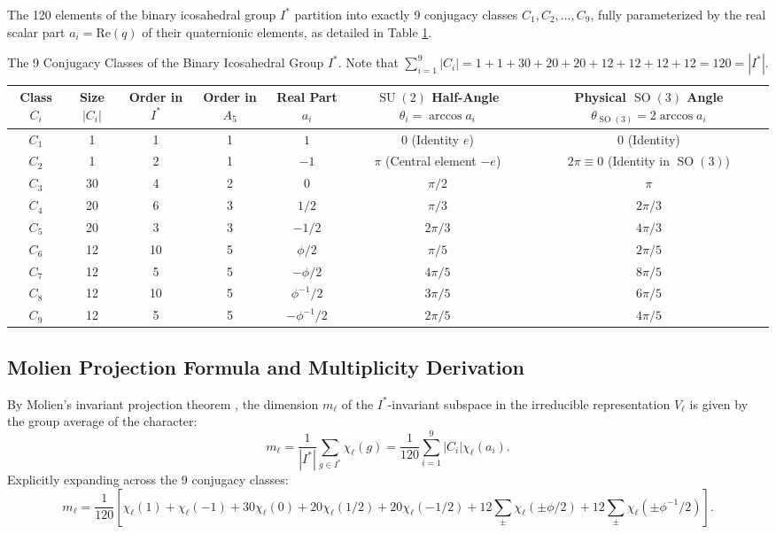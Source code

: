 \documentclass[11pt,a4paper]{article}
\theoremstyle{definition}
\DeclareMathOperator{\SU}{SU}
\DeclareMathOperator{\SO}{SO}
\begin{document}
The 120 elements of the binary icosahedral group $I^*$ partition into exactly 9 conjugacy classes $C_1, C_2, \dots, C_9$, fully parameterized by the real scalar part $a_i = \mathrm{Re}(q)$ of their quaternionic elements, as detailed in Table \ref{tab:classes}.

\begin{table}[htbp]
\centering
\small
\caption{The 9 Conjugacy Classes of the Binary Icosahedral Group $I^*$. Note that $\sum_{i=1}^9 |C_i| = 1 + 1 + 30 + 20 + 20 + 12 + 12 + 12 + 12 = 120 = |I^*|$.}
\label{tab:classes}
\vspace{0.5em}
\begin{tabular}{ccccccc}
\toprule
\textbf{Class $C_i$} & \textbf{Size $|C_i|$} & \textbf{Order in $I^*$} & \textbf{Order in $A_5$} & \textbf{Real Part $a_i$} & \textbf{$\SU(2)$ Half-Angle $\theta_i = \arccos a_i$} & \textbf{Physical $\SO(3)$ Angle $\theta_{\SO(3)} = 2\arccos a_i$} \\
\midrule
$C_1$ & 1  & 1  & 1 & $1$            & $0$ (Identity $e$)           & $0$ (Identity) \\
$C_2$ & 1  & 2  & 1 & $-1$           & $\pi$ (Central element $-e$) & $2\pi \equiv 0$ (Identity in $\SO(3)$) \\
$C_3$ & 30 & 4  & 2 & $0$            & $\pi/2$                      & $\pi$ \\
$C_4$ & 20 & 6  & 3 & $1/2$          & $\pi/3$                      & $2\pi/3$ \\
$C_5$ & 20 & 3  & 3 & $-1/2$         & $2\pi/3$                     & $4\pi/3$ \\
$C_6$ & 12 & 10 & 5 & $\phi/2$       & $\pi/5$                      & $2\pi/5$ \\
$C_7$ & 12 & 5  & 5 & $-\phi/2$      & $4\pi/5$                     & $8\pi/5$ \\
$C_8$ & 12 & 10 & 5 & $\phi^{-1}/2$  & $3\pi/5$                     & $6\pi/5$ \\
$C_9$ & 12 & 5  & 5 & $-\phi^{-1}/2$ & $2\pi/5$                     & $4\pi/5$ \\
\bottomrule
\end{tabular}
\end{table}

\subsection{Molien Projection Formula and Multiplicity Derivation}
By Molien's invariant projection theorem \cite{Molien1897}, the dimension $m_\ell$ of the $I^*$-invariant subspace in the irreducible representation $V_\ell$ is given by the group average of the character:
\begin{equation}
m_\ell = \frac{1}{|I^*|} \sum_{g \in I^*} \chi_\ell (g) = \frac{1}{120} \sum_{i=1}^9 |C_i| \chi_\ell (a_i).
\end{equation}
Explicitly expanding across the 9 conjugacy classes:
\begin{equation}
m_\ell = \frac{1}{120} \left[ \chi_\ell(1) + \chi_\ell(-1) + 30 \chi_\ell(0) + 20 \chi_\ell(1/2) + 20 \chi_\ell(-1/2) + 12 \sum_{\pm} \chi_\ell(\pm \phi/2) + 12 \sum_{\pm} \chi_\ell(\pm \phi^{-1}/2) \right].
\end{equation}
\end{document}
